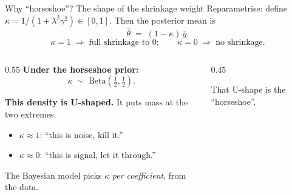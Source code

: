 \documentclass[10pt,aspectratio=169]{beamer}
\begin{document}
\begin{frame}{Why ``horseshoe''? The shape of the shrinkage weight}
Reparametrise: define $\kappa = 1 / (1 + \lambda^2 \gamma^2) \in [0,1]$. Then the posterior mean is
\[
\widehat\theta \;=\; (1 - \kappa)\,\bar y.
\]
\[
\kappa = 1 \;\Rightarrow\; \text{full shrinkage to 0}; \qquad
\kappa = 0 \;\Rightarrow\; \text{no shrinkage}.
\]

\begin{columns}[T,onlytextwidth]
\begin{column}{0.55\textwidth}
\vspace{0.4cm}
\textbf{Under the horseshoe prior:}
\[
\kappa \;\sim\; \mathrm{Beta}\!\left(\tfrac{1}{2}, \tfrac{1}{2}\right).
\]

\bigskip

\textbf{This density is U-shaped.} It puts mass at the two extremes:
\begin{itemize}
  \item $\kappa \approx 1$: ``this is noise, kill it.''
  \item $\kappa \approx 0$: ``this is signal, let it through.''
\end{itemize}

\smallskip

\alert{The Bayesian model picks $\kappa$ \emph{per coefficient}, from the data.}
\end{column}
\begin{column}{0.45\textwidth}
\centering
{}

\vspace{-0.2cm}
{\footnotesize That U-shape is the ``horseshoe''.}
\end{column}
\end{columns}
\end{frame}
\end{document}

